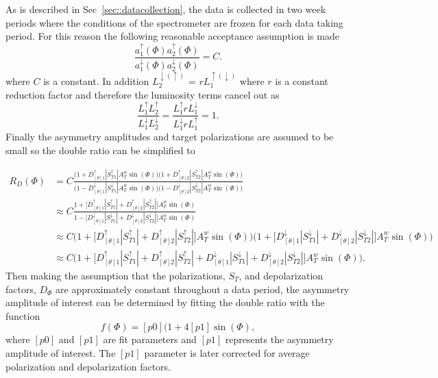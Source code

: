 \noindent
As is described in Sec~\ref{sec::datacollection}, the data is collected in two
week periods where the conditions of the spectrometer are frozen for each data
taking period.  For this reason the following reasonable acceptance assumption
is made
\begin{equation}
  \label{equ::a_resonable_assump}
  \frac{a_1^\uparrow(\Phi) a_2^\uparrow(\Phi)}
       {a_1^\downarrow(\Phi) a_2^\downarrow(\Phi)}
       = C.
\end{equation}
\noindent
where $C$ is a constant.  In addition
$L^{\downarrow(\uparrow)}_2$ = $rL^{\uparrow(\downarrow)}_1$ where $r$ is a
constant reduction factor and therefore the luminosity terms cancel out as
\begin{equation}
  \frac{L_1^{\uparrow}L_2^{\uparrow}}{L_1^{\downarrow}L_2^{\downarrow}}
  = \frac{L_1^{\uparrow}rL_1^{\downarrow}}{L_1^{\downarrow}rL_1^{\uparrow}}
  = 1.
\end{equation}
\noindent
Finally the asymmetry amplitudes and target polarizations are assumed to be
small so the double ratio can be simplified to

\begin{align}
  R_D(\Phi) &=
  C\frac{\Big(1+D_{[\theta]1}^{\uparrow}|S_{T1}^{\uparrow}|A^w_T\sin(\Phi)\Big)
    \Big(1+D_{[\theta]2}^{\uparrow}|S_{T2}^{\uparrow}|A^w_T\sin(\Phi)\Big)}
  {\Big(1-D_{[\theta]1}^{\downarrow}|S_{T1}^{\downarrow}|A^w_T\sin(\Phi)\Big)
    \Big(1-D_{[\theta]2}^{\downarrow}|S_{T2}^{\downarrow}|A^w_T\sin(\Phi)\Big)}
  \\ \nonumber &\approx
  C\frac{1+\Big[D_{[\theta]1}^{\uparrow}|S_{T1}^{\uparrow}|+D_{[\theta]2}^{\uparrow}|S_{T2}^{\uparrow}|\Big]
    A^w_T\sin(\Phi)}
  {1-\Big[D_{[\theta]1}^{\downarrow}|S_{T1}^{\downarrow}|+D_{[\theta]2}^{\downarrow}|S_{T2}^{\downarrow}|\Big]
    A^w_T\sin(\Phi)} \\ \nonumber &\approx
  C\Big(1+\Big[D_{[\theta]1}^{\uparrow}|S_{T1}^{\uparrow}|+D_{[\theta]2}^{\uparrow}|S_{T2}^{\uparrow}|\Big]
  A^w_T\sin(\Phi)\Big)\Big(1+\Big[D_{[\theta]1}^{\downarrow}|S_{T1}^{\downarrow}|+D_{[\theta]2}^{\downarrow}|S_{T2}^{\downarrow}|\Big]
  A^w_T\sin(\Phi)\Big) \\ \nonumber &\approx C\Big(1 +
  \Big[D_{[\theta]1}^{\uparrow}|S_{T1}^{\uparrow}|+D_{[\theta]2}^{\uparrow}|S_{T2}^{\uparrow}|+D_{[\theta]1}^{\downarrow}|S_{T1}^{\downarrow}|+D_{[\theta]2}^{\downarrow}|S_{T2}^{\downarrow}|\Big]A^w_T\sin(\Phi)\Big).
\end{align}
\noindent
Then making the assumption that the polarizations, $S_T$, and depolarization
factors, $D_{\Phi}$ are approximately constant throughout a data period, the
asymmetry amplitude of interest can be determined by fitting the double ratio
with the function
\begin{equation}
  \label{equ::dr_fit_formula}
  f(\Phi) = [p0](1+4[p1]\sin(\Phi),
\end{equation}
\noindent
where $[p0]$ and $[p1]$ are fit parameters and $[p1]$ represents the asymmetry
amplitude of interest.  The $[p1]$ parameter is later corrected for average
polarization and depolarization factors.

